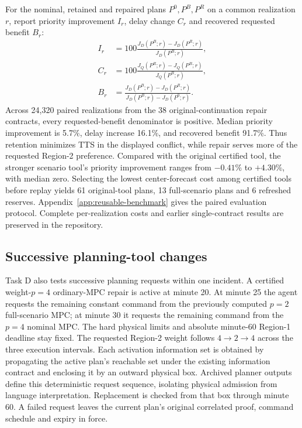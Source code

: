 \documentclass[journal,10pt]{IEEEtran}
\newcommand{\appref}[1]{Appendix~\ref{#1}}
\begin{document}
For the nominal, retained and repaired plans $P^0,P^B,P^R$ on a common
realization $r$, report priority improvement $I_r$, delay change $C_r$ and
recovered requested benefit $B_r$:
\begin{equation}
\begin{aligned}
I_r&=100\frac{J_D(P^B;r)-J_D(P^R;r)}{J_D(P^B;r)},\\
C_r&=100\frac{J_Q(P^R;r)-J_Q(P^B;r)}{J_Q(P^B;r)},\\
B_r&=\frac{J_D(P^B;r)-J_D(P^R;r)}{J_D(P^B;r)-J_D(P^0;r)}.
\end{aligned}
\label{eq:benchmark-repair-metrics}
\end{equation}
Across 24,320 paired realizations from the 38 original-continuation repair
contracts, every requested-benefit denominator is positive. Median priority
improvement is 5.7\%, delay increase 16.1\%, and recovered benefit 91.7\%.
Thus retention minimizes TTS in the displayed conflict, while repair serves
more of the requested Region-2 preference. Compared with the original
certified tool, the stronger scenario tool's priority improvement ranges
from $-0.41$\% to $+4.30$\%, with median zero. Selecting the lowest center-forecast
cost among certified tools before replay yields 61 original-tool plans,
13 full-scenario plans and 6 refreshed reserves. \appref{app:reusable-benchmark}
gives the paired evaluation protocol. Complete per-realization costs and
earlier single-contract results are preserved in the repository.

\subsection{Successive planning-tool changes}
\label{sec:sequential-handover-results}

Task D also tests successive planning requests within one incident. A
certified weight-$p=4$ ordinary-MPC repair is active at minute 20. At
minute 25 the agent requests the remaining constant command from the
previously computed $p=2$ full-scenario MPC; at minute 30 it requests the
remaining command from the $p=4$ nominal MPC. The hard physical limits and
absolute minute-60 Region-1 deadline stay fixed. The requested Region-2
weight follows $4\to2\to4$ across the three execution intervals. Each
activation information set is obtained by propagating the active plan's
reachable set under the existing information contract and enclosing it
by an outward physical box.
Archived planner outputs define this deterministic request sequence, isolating
physical admission from language interpretation.
Replacement is checked from that box through minute 60. A failed request
leaves the current plan's original correlated proof, command schedule and
expiry in force.
\end{document}
